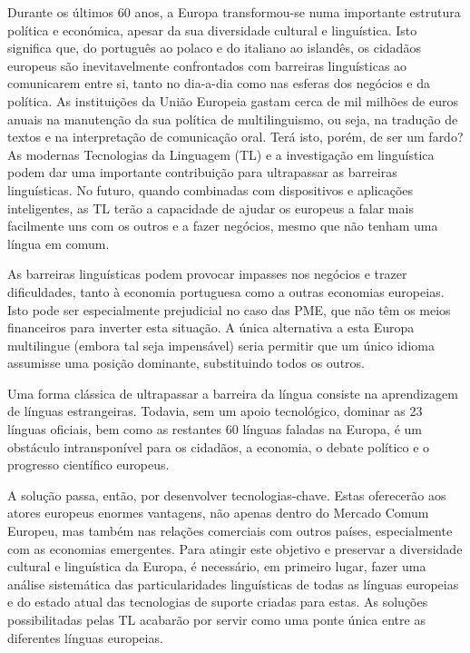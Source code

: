 \begin{multicols}{2}
Durante os últimos 60 anos, a Europa transformou-se numa importante estrutura política e económica, apesar da sua diversidade cultural e linguística. Isto significa que, do português ao polaco e do italiano ao islandês, os cidadãos europeus são inevitavelmente confrontados com barreiras linguísticas ao comunicarem entre si, tanto no dia-a-dia como nas esferas dos negócios e da política. As instituições da União Europeia gastam cerca de mil milhões de euros anuais na manutenção da sua política de multilinguismo, ou seja, na tradução de textos e na interpretação de comunicação oral. Terá isto, porém, de ser um fardo? As modernas Tecnologias da Linguagem (TL) e a investigação em linguística podem dar uma importante contribuição para ultrapassar as barreiras linguísticas. No futuro, quando combinadas com dispositivos e aplicações inteligentes, as TL terão a capacidade de ajudar os europeus a falar mais facilmente uns com os outros e a fazer negócios, mesmo que não tenham uma língua em comum.


As barreiras linguísticas podem provocar impasses nos negócios e trazer dificuldades, tanto à economia portuguesa como a outras economias europeias. Isto pode ser especialmente prejudicial no caso das PME, que não têm os meios financeiros para inverter esta situação. A única alternativa a esta Europa multilingue (embora tal seja impensável) seria permitir que um único idioma assumisse uma posição dominante, substituindo todos os outros.

Uma forma clássica de ultrapassar a barreira da língua consiste na aprendizagem de línguas estrangeiras. Todavia, sem um apoio tecnológico, dominar as 23 línguas oficiais, bem como as restantes 60 línguas faladas na Europa, é um obs\-tá\-cu\-lo intransponível para os cidadãos, a economia, o debate político e o progresso científico europeus.

A solução passa, então, por desenvolver tecnologias-chave. Estas oferecerão aos atores europeus enormes vantagens, não apenas dentro do Mercado Comum Europeu, mas também nas relações comerciais com outros países, especialmente com as economias emergentes. Para atingir este objetivo e preservar a diversidade cultural e linguística da Europa, é necessário, em primeiro lugar, fazer uma análise sistemática das particularidades linguísticas de todas as línguas europeias e do estado atual das tecnologias de suporte criadas para estas. As soluções possibilitadas pelas TL acabarão por servir como uma ponte única entre as diferentes línguas europeias.


\end{multicols}
